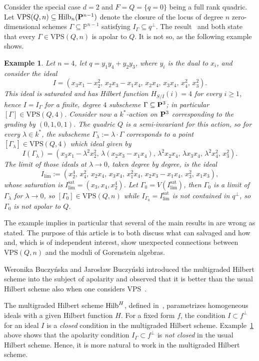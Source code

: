 \documentclass{amsart}
\newcommand{\Hilb}{{\rm{Hilb}}}
\newcommand{\PP}{{\bf P}}
\newcommand{\Hvanilla}{\Hilb_{n}(\PP^{n-1})}
\newcommand{\VPSn}{\mathrm{VPS}(Q, n)}
\newcommand{\VPSf}{\mathrm{VPS}(Q, 4)}
\newcommand{\sat}{\mathrm{sat}}%
\newtheorem{example}[lemma]{\bf Example}
\newcommand{\kk}{k}
\begin{document}
Consider the special case $d = 2$ and $F = Q=\{q=0\}$ being a full rank quadric.
Let $\VPSn\subseteq \Hvanilla$ denote the closure of the locus of
degree $n$ zero-dimensional schemes $\Gamma \subseteq \mathbb{P}^{n-1}$
satisfying $I_{\Gamma} \subseteq q^{\perp}$. The
result~\cite[Corollary~2.2]{RS} and \cite[Proposition~6.5]{Skjelnes_Stahl}
both state that every $\Gamma\in \VPSn$ is apolar to $Q$.
It is not so, as the following example shows.
\begin{example}\label{ex:nonsaturatedlimit,n=4}
Let $n=4$, let $q = y_1y_4 +
y_2y_3$, where $y_i$ is the dual to $x_i$, and consider the ideal
\[
    I = (x_3x_1 - x_2^2,\, x_2x_3 - x_1x_4,\, x_2x_4,\, x_3x_4,\, x_4^2,\, x_3^2).
\]
This ideal is saturated and has Hilbert function $H_{S/I}(i) = 4$ for every
$i\geq 1$, hence $I = I_{\Gamma}$ for a finite, degree $4$ subscheme $\Gamma
\subseteq \PP^3$; in particular $[\Gamma]\in \VPSf$. Consider now a
$\kk^*$-action on $\PP^3$ corresponding to the grading by $(0, 1, 0, 1)$. The
quadric $Q$ is a semi-invariant for this action, so for every $\lambda\in
\kk^*$, the subscheme $\Gamma_{\lambda} := \lambda\cdot \Gamma$ corresponds to
a point $[\Gamma_{\lambda}]\in \VPSf$ which ideal given by
\[
    I(\Gamma_\lambda) = (x_3x_1 - \lambda^2x_2^2,\, \lambda(x_2x_3 - x_1x_4),\,
    \lambda^2x_2x_4,\, \lambda x_3x_4,\,
    \lambda^2x_4^2,\, x_3^2).
\]
The limit of those ideals at $\lambda\to 0$, taken degree by degree, is the ideal
\[
    I_{\lim} := (x_{2}^{4},\,x_{4}^{2 },\,x_{2}x_{4},\,x_{3}x_{4},\,x_{1}^{2}x_{4
    },\,x_{2}x_{3}-x_{1}x_{4},\,x_{3}^{2},\,x_{1 }x_{3}),
\]
whose saturation is $I_{\lim}^{\sat} = (x_3, x_4, x_2^4)$. Let $\Gamma_0 =
V(I_{\lim}^{\sat})$, then $\Gamma_0$ is a limit of $\Gamma_{\lambda}$ for $\lambda\to
0$, so $[\Gamma_0]\in \VPSn$ while $I_{\Gamma_0}=I_{\lim}^{\sat}$ is not contained in $q^\perp$, so $\Gamma_0$ is not apolar to
$Q$.
\end{example}
The example implies in particular that several of the main results in
\cite{RS} are wrong as stated.
The purpose of this article is to both discuss what can salvaged and how and,
which is of independent interest, show unexpected connections between
$\VPSn$ and the moduli of Gorenstein algebras.

Weronika Buczy\'{n}ska and Jaros{\l}aw Buczy\'{n}ski introduced the multigraded
Hilbert scheme into the subject of apolarity and
observed that it is better than the usual Hilbert scheme also when one
considers VPS~\cite[\S7.6]{BB}.

The multigraded Hilbert scheme $\Hilb^H$, defined
in~\cite{Haiman_Sturmfels__multigraded}, parametrizes homogeneous ideals with a given Hilbert function $H$.
For a fixed form $f$, the condition   $I\subset f^\perp$ for an
ideal $I$ is a \emph{closed} condition in the multigraded Hilbert scheme.
Example~\ref{ex:nonsaturatedlimit,n=4} above shows that the apolarity condition $I_{\Gamma}\subset
f^{\perp}$ is \emph{not closed} in the usual Hilbert scheme. Hence, it is more
natural to work in the multigraded Hilbert scheme.
\end{document}
